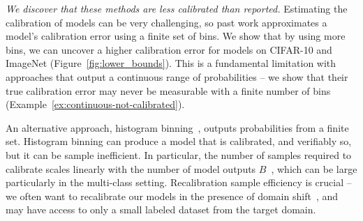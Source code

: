

\emph{We discover that these methods are less calibrated than reported.} Estimating the calibration of models can be very challenging, so past work approximates a model's calibration error using a finite set of bins. We show that by using more bins, we can uncover a higher calibration error for models on CIFAR-10 and ImageNet (Figure~\ref{fig:lower_bounds}). This is a fundamental limitation with approaches that output a continuous range of probabilities -- we show that their true calibration error may never be measurable with a finite number of bins (Example~\ref{ex:continuous-not-calibrated}).

An alternative approach, histogram binning~\cite{zadrozny2001calibrated}, outputs probabilities from a finite set.
Histogram binning can produce a model that is calibrated, and verifiably so, but it can be sample inefficient.
In particular, the number of samples required to calibrate scales linearly with the number of model outputs $B$~\cite{naeini2014binary}, which can be large particularly in the multi-class setting.
Recalibration sample efficiency is crucial -- we often want to recalibrate our models in the presence of domain shift~\cite{hendrycks2019anomaly}, and may have access to only a small labeled dataset from the target domain.

